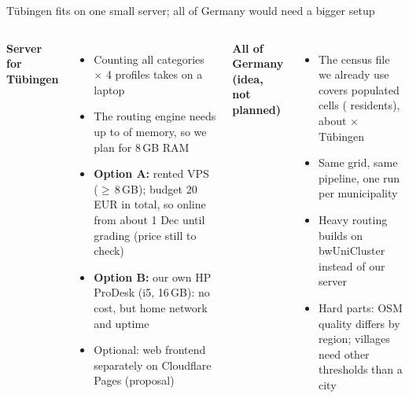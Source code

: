 \documentclass[aspectratio=169,10pt]{beamer}
\begin{document}
\begin{frame}{Tübingen fits on one small server; all of Germany would need a bigger setup}
  \begin{columns}[T,onlytextwidth]
      \textbf{Server for Tübingen}
      \begin{itemize}\footnotesize
        \item Counting all \factCurCategories{} categories $\times$ 4 profiles takes
              \factCurCountRuntime{} on a laptop
        \item The routing engine needs up to \factCyclingValhallaPeak{} of memory, so we plan
              for 8\,GB RAM
        \item \textbf{Option A:} rented VPS ($\ge$\,8\,GB); budget 20\,EUR in total, so online
              from about 1 Dec until grading (price still to check)
        \item \textbf{Option B:} our own HP ProDesk (i5, 16\,GB): no cost, but home network and
              uptime
        \item Optional: web frontend separately on Cloudflare Pages (proposal)
      \end{itemize}
      \textbf{All of Germany (idea, not planned)}
      \begin{itemize}\footnotesize
        \item The census file we already use covers \factDeCells{} populated cells
              (\factDeResidents{} residents), about \factDeCellFactor{}$\times$ Tübingen
        \item Same grid, same pipeline, one run per municipality
        \item Heavy routing builds on bwUniCluster instead of our server
        \item Hard parts: OSM quality differs by region; villages need other thresholds than
              a city
      \end{itemize}
  \end{columns}
\end{frame}
\end{document}
